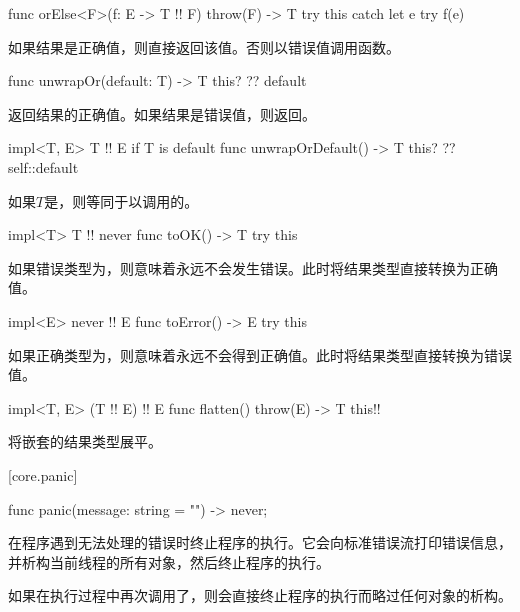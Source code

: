 \begin{itemdecl}
func orElse<F>(f: E -> T !! F) throw(F) -> T {
    try this catch let e { try f(e) }
}
\end{itemdecl}

\pnum
如果结果是正确值，则直接返回该值。否则以错误值调用函数。

\begin{itemdecl}
func unwrapOr(default: T) -> T {
    this? ?? default
}
\end{itemdecl}

\pnum
{}返回结果的正确值。如果结果是错误值，则返回。

\begin{itemdecl}
impl<T, E> T !! E if T is default {
    func unwrapOrDefault() -> T {
        this? ?? self::default
    }
}
\end{itemdecl}

\pnum
如果$T$是，则等同于以调用的。

\begin{itemdecl}
impl<T> T !! never {
    func toOK() -> T {
        try this
    }
}
\end{itemdecl}

\pnum
如果错误类型为，则意味着永远不会发生错误。此时将结果类型直接转换为正确值。

\begin{itemdecl}
impl<E> never !! E {
    func toError() -> E {
        try this
    }
}
\end{itemdecl}

\pnum
如果正确类型为，则意味着永远不会得到正确值。此时将结果类型直接转换为错误值。

\begin{itemdecl}
impl<T, E> (T !! E) !! E {
    func flatten() throw(E) -> T {
        this!!
    }
}
\end{itemdecl}

\pnum
{}将嵌套的结果类型展平。

[core.panic]{}

\begin{itemdecl}
func panic(message: string = "") -> never;
\end{itemdecl}

\pnum
{}在程序遇到无法处理的错误时终止程序的执行。它会向标准错误流打印错误信息，并析构当前线程的所有对象，然后终止程序的执行。

\pnum
如果在执行过程中再次调用了，则会直接终止程序的执行而略过任何对象的析构。